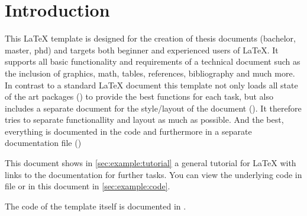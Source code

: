 
\chapter{Introduction}
This \LaTeX{} template is designed for the creation of thesis documents (bachelor, master, phd) and targets both beginner and experienced users of \LaTeX{}. It supports all basic functionality and requirements of a technical document such as the inclusion of graphics, math, tables, references, bibliography and much more. In contrast to a standard LaTeX document this template not only loads all state of the art packages () to provide the best functions for each task, but also includes a separate document for the style/layout of the document (). It therefore tries to separate functionallity and layout as much as possible. And the best, everything is documented in the code and furthermore in a separate documentation file ()

This document shows in \cref{sec:example:tutorial} a general tutorial for \LaTeX{} with links to the documentation for further tasks. You can view the underlying code in file  or in this document in \cref{sec:example:code}.

The code of the template itself is documented in .